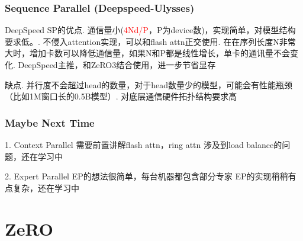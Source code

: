 \documentclass{beamer}
\begin{document}
\begin{frame}[fragile]
\frametitle{Sequence Parallel (Deepspeed-Ulysses)}

DeepSpeed SP的优点. 通信量小(\textcolor{red}{4Nd/P}，P为device数)，实现简单，对模型结构要求低。. 不侵入attention实现，可以和flash attn正交使用. 在在序列长度N非常大时，增加卡数可以降低通信量，如果N和P都是线性增长，单卡的通讯量不会变化. DeepSpeed主推，和ZeRO3结合使用，进一步节省显存\newline\newline

缺点. 并行度不会超过head的数量，对于head数量少的模型，可能会有性能瓶颈（比如1M窗口长的0.5B模型）. 对底层通信硬件拓扑结构要求高\newline

\end{frame}


\begin{frame}[fragile]
\frametitle{Maybe Next Time}

1. Context Parallel\newline
需要前置讲解flash attn，ring attn\newline
涉及到load balance的问题，还在学习中\newline

2. Expert Parallel\newline
EP的想法很简单，每台机器都包含部分专家\newline
EP的实现稍稍有点复杂，还在学习中\newline

\end{frame}



\section{ZeRO}
\end{document}
